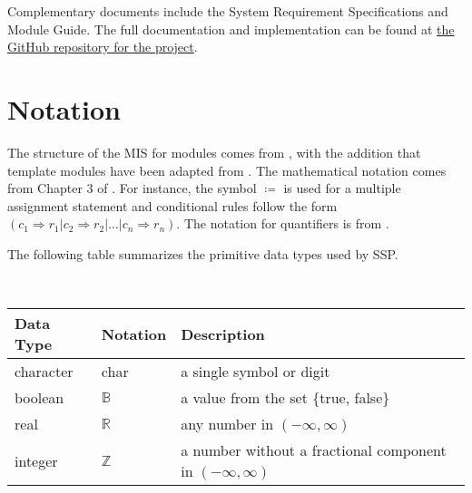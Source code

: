 \documentclass[12pt, titlepage]{article}
\newcommand{\progname}{SSP}
\begin{document}
Complementary documents include the System Requirement Specifications
and Module Guide.  The full documentation and implementation can be
found at 
\href{https://github.com/smiths/caseStudies/tree/master/CaseStudies/ssp}
{the GitHub repository for the project}. 


\section{Notation}

The structure of the MIS for modules comes from \citet{HoffmanAndStrooper1995},
with the addition that template modules have been adapted from
\cite{GhezziEtAl2003}.  The mathematical notation comes from Chapter 3 of
\citet{HoffmanAndStrooper1995}.  For instance, the symbol $\coloneqq$ is used 
for a multiple assignment statement and conditional rules follow the form $(c_1
\Rightarrow r_1 | c_2 \Rightarrow r_2 | \dots | c_n \Rightarrow r_n )$. The 
notation for quantifiers is from \citet{GriesAndSchneider1993}.

The following table summarizes the primitive data types used by \progname.

~\newline \renewcommand*{\arraystretch}{1.5}
\begin{tabular}{p{} p{} p{}}
  \hline \textbf{Data Type} & \textbf{Notation} & \textbf{Description}
  \\ \hline
  
  character & char & a single symbol or digit\\

  boolean & $\mathbb{B}$ & a value from the set \{true, false\}\\
  
  real & $\mathbb{R}$ & any number in $\left( -\infty, \infty \right)$\\
  
  integer & $\mathbb{Z}$ & a number without a fractional component in $\left( 
  -\infty, \infty \right)$\\
  \bottomrule
\end{tabular}
\end{document}
